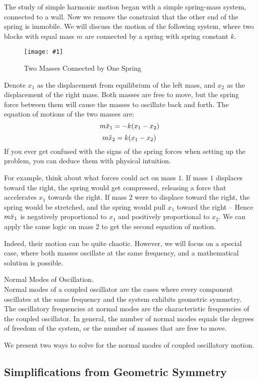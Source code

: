 \documentclass[11pt]{article}
\newcommand{\fig}[4]{
    \begin{figure}[H]
        \centering
        \texttt{[image: \#1]}
        \caption{#2}
        \label{exp4fit}
    \end{figure}
}
\theoremstyle{gangnamstyle}{\newtheorem{definition}{Definition}[]}
\theoremstyle{gangnamstyle}{\newtheorem{example}{Example}[]}
\theoremstyle{gangnamstyle}{\newtheorem{problem}{Problem}[]}
\theoremstyle{gangnamstyle}{\newtheorem{warning}{Warning}[]}
\begin{document}
The study of simple harmonic motion began with a simple spring-mass system, connected to a wall. Now we remove the constraint that the other end of the spring is immobile. We will discuss the motion of the following system, where two blocks with equal mass $m$ are connected by a spring with spring constant $k$. 

\fig{figs/n3/twomass.jpg}{Two Masses Connected by One Spring}{1}{0}

Denote $x_1$ as the displacement from equilibrium of the left mass, and $x_2$ as the displacement of the right mass. Both masses are free to move, but the spring force between them will cause the masses to oscillate back and forth. The equation of motions of the two masses are: 
\[ m\Ddot{x}_1 = -k(x_1 - x_2) \]
\[ m\Ddot{x}_2 = k(x_1 - x_2) \]
If you ever get confused with the signs of the spring forces when setting up the problem, you can deduce them with physical intuition. 

For example, think about what forces could act on mass $1$. If mass $1$ displaces toward the right, the spring would get compressed, releasing a force that accelerates $x_1$ towards the right. If mass $2$ were to displace toward the right, the spring would be stretched, and the spring would pull $x_1$ toward the right -- Hence $m\Ddot{x}_1$ is negatively proportional to $x_1$ and positively proportional to $x_2$. We can apply the same logic on mass $2$ to get the second equation of motion. 

Indeed, their motion can be quite chaotic. However, we will focus on a special case, where both masses oscillate at the same frequency, and a mathematical solution is possible. 

\begin{definition}
Normal Modes of Oscillation. \\
Normal modes of a coupled oscillator are the cases where every component oscillates at the same frequency and the system exhibits geometric symmetry. The oscillatory frequencies at normal modes are the characteristic frequencies of the coupled oscillator. In general, the number of normal modes equals the degrees of freedom of the system, or the number of masses that are free to move. 
\end{definition}

We present two ways to solve for the normal modes of coupled oscillatory motion. 

\subsection{Simplifications from Geometric Symmetry}
\end{document}
